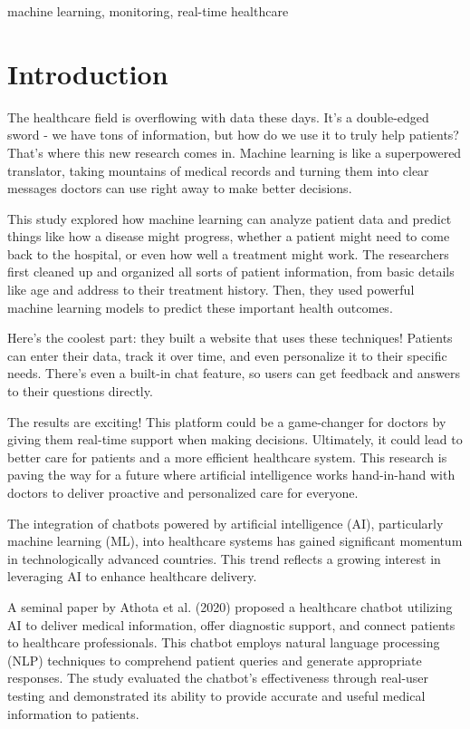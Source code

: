 \documentclass[conference]{IEEEtran}
\begin{document}
\begin{IEEEkeywords}
machine learning, monitoring, real-time healthcare

\end{IEEEkeywords}

\section{Introduction}

The healthcare field is overflowing with data these days. It's a double-edged sword - we have tons of information, but how do we use it to truly help patients? That's where this new research comes in. Machine learning is like a superpowered translator, taking mountains of medical records and turning them into clear messages doctors can use right away to make better decisions.

This study explored how machine learning can analyze patient data and predict things like how a disease might progress, whether a patient might need to come back to the hospital, or even how well a treatment might work. The researchers first cleaned up and organized all sorts of patient information, from basic details like age and address to their treatment history. Then, they used powerful machine learning models to predict these important health outcomes.

Here's the coolest part: they built a website that uses these techniques! Patients can enter their data, track it over time, and even personalize it to their specific needs. There's even a built-in chat feature, so users can get feedback and answers to their questions directly.

The results are exciting! This platform could be a game-changer for doctors by giving them real-time support when making decisions. Ultimately, it could lead to better care for patients and a more efficient healthcare system. This research is paving the way for a future where artificial intelligence works hand-in-hand with doctors to deliver proactive and personalized care for everyone.
    
    The integration of chatbots powered by artificial intelligence (AI), particularly machine learning (ML), into healthcare systems has gained significant momentum in technologically advanced countries. This trend reflects a growing interest in leveraging AI to enhance healthcare delivery.

    A seminal paper by Athota et al. (2020) \cite{athota2020chatbot} proposed a healthcare chatbot utilizing AI to deliver medical information, offer diagnostic support, and connect patients to healthcare professionals. This chatbot employs natural language processing (NLP) techniques to comprehend patient queries and generate appropriate responses. The study evaluated the chatbot's effectiveness through real-user testing and demonstrated its ability to provide accurate and useful medical information to patients.
    
\end{document}
